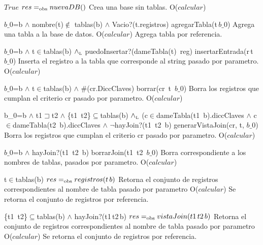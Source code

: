 
 {$True$}
 {$res =_{\mathrm{obs}} nuevaDB()$}
 {Crea una base sin tablas.}
 {O($calcular$)}
 {}

 {$b\_0$=b $\land$ nombre(t)$\notin$ tablas(b) $\land$ Vacio?(t.registros)}
 {agregarTabla(t\,$b\_0$)}
 {Agrega una tabla a la base de datos.}
 {O($calcular$)}
 {Agrega tabla por referencia.} 
 
 {$b\_0$=b $\land$ t$\in$tablas(b) $\land_{\mathrm{\scriptscriptstyle{L}}}$ puedoInsertar?(dameTabla(t)\, reg)}
 {insertarEntrada(r\,t \,$b\_0$)}
 {Inserta el registro a la tabla que corresponde al string pasado por parametro.}
 {O($calcular$)}
 {} 
 
 {$b\_0$=b $\land$ t$\in$tablas(b) $\land$ \#(cr.DiccClaves)}
 {borrar(cr\, t\, $b\_0$)}
 {Borra los registros que cumplan el criterio cr pasado por parametro.}
 {O($calcular$)}
 {} 	

 {b\_0=b $\land$ t1$\sqsupset$t2 $\land$ \{t1\, t2\}$\subseteq$tablas(b) $\land_{\mathrm{\scriptscriptstyle{L}}}$ (c$\in$dameTabla(t1\, b).diccClaves $\land$ c$\in$dameTabla(t2\, b).diccClaves $\land$ $\neg$hayJoin?(t1\, t2\, b)}
 {generarVistaJoin(cr, t, $b\_0$)}
 {Borra los registros que cumplan el criterio cr pasado por parametro.}
 {O($calcular$)}
 {} 	
 
 {$b\_0$=b $\land$ hayJoin?(t1\, t2\, b)}
 {borrarJoin(t1\, t2\, $b\_0$)}
 {Borra correspondiente a los nombres de tablas, pasados por parametro.}
 {O($calcular$)}
 {}


 {t$\in$tablas(b)}
 {$res =_{\mathrm{obs}} registros(t\, b)$}
 {Retorna el conjunto de registros correspondientes al nombre de tabla pasado por parametro}
 {O($calcular$)}
 {Se retorna el conjunto de registros por referencia.} 


 {\{t1\, t2\}$\subseteq$tablas(b) $\land$ hayJoin?(t1\,t2\,b)}
 {$res =_{\mathrm{obs}} vistaJoin(t1\, t2\, b)$}
 {Retorna el conjunto de registros correspondientes al nombre de tabla pasado por parametro}
 {O($calcular$)}
 {Se retorna el conjunto de registros por referencia.} 

